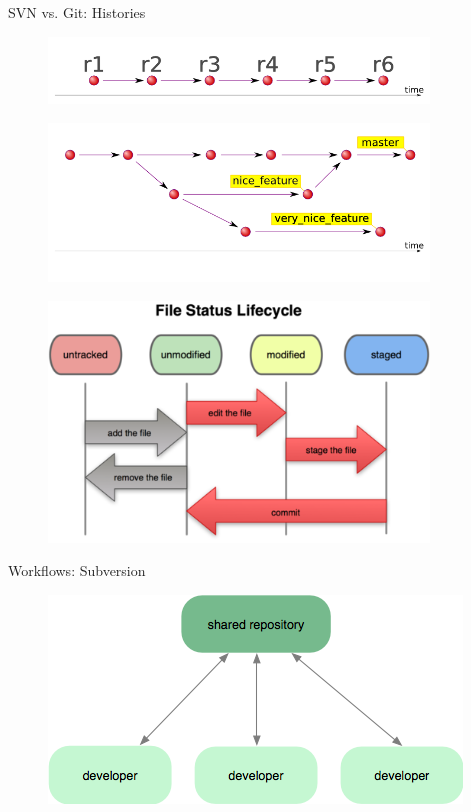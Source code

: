 \documentclass{beamer}
\begin{document}
\begin{frame}{SVN vs. Git: Histories}
  \begin{figure}
   \includegraphics[width=0.90\textwidth]{./images/svn-timeline.png}
  \end{figure}

  \begin{figure}
   \includegraphics[width=0.90\textwidth]{./images/git-timeline.png}
  \end{figure}
\end{frame}

\begin{frame}
 \begin{figure}
  \includegraphics[width=0.90\textwidth]{./images/file-status-lifecycle.png}
 \end{figure}
\end{frame}

\begin{frame}{Workflows: Subversion}

  \begin{figure}
     \includegraphics[scale=1.0]{./images/workflow-svn.png}
  \end{figure}

\end{frame}
\end{document}
